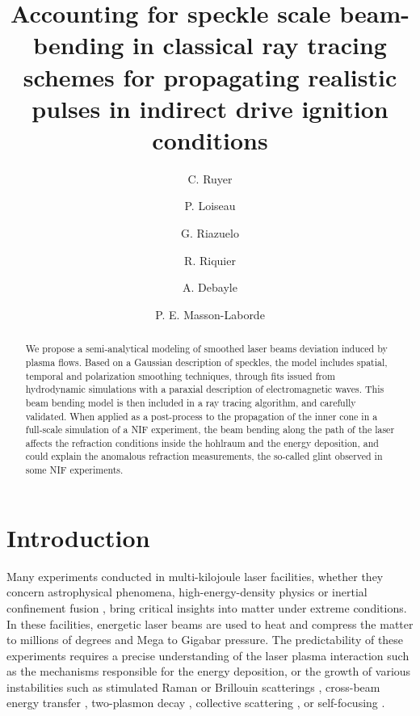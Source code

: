 \documentclass[%
 reprint,
 amsmath,amssymb,
 aps,
]{revtex4-1}
\begin{document}
\title{Accounting for speckle scale  beam-bending in classical ray tracing schemes for propagating realistic pulses in indirect drive ignition conditions}
\author{C. Ruyer}
\author{P. Loiseau}
\author{G. Riazuelo}
\author{R. Riquier}
\author{A. Debayle}
\author{P. E. Masson-Laborde}
\begin{abstract}
We propose a semi-analytical modeling of smoothed laser beams deviation induced by  plasma flows. Based on a Gaussian description of speckles, the model includes spatial, temporal and polarization smoothing techniques, through fits issued from  hydrodynamic simulations with a paraxial description of electromagnetic waves.
This beam bending model is then included in a ray tracing algorithm, and carefully validated.
When applied as a post-process to the propagation of the  inner cone in a full-scale simulation of a NIF experiment, the beam bending along the path of the laser affects the refraction conditions inside the hohlraum and the energy deposition, and could explain the anomalous refraction measurements, the so-called glint observed in some NIF experiments.
\end{abstract}

\maketitle

\section{Introduction}
Many experiments conducted in multi-kilojoule laser facilities, whether they concern astrophysical phenomena, high-energy-density physics \cite{Drake2006} or inertial confinement fusion \cite{Lindl_2004,Cavailler_2005,MRE_Zheng_2017},
bring critical insights into  matter under extreme  conditions. 
In these facilities, energetic laser beams are used to heat  and compress the matter to millions of degrees and  Mega to Gigabar pressure. 
The predictability of these experiments requires a precise understanding of the laser plasma interaction such as 
the mechanisms responsible for the energy deposition, or the growth of various instabilities such as stimulated Raman or Brillouin scatterings  \cite{Shen_1965,Forslund_1973,POP_Liu_2009,hao_2013}, cross-beam energy transfer \cite{hao_2016}, two-plasmon decay  \cite{Dubois_1995,Russell_2001}, collective scattering \cite[]{Dubois_1992,POP_Xiao_2019,MRE_Qiu_2021}, or self-focusing  \cite{Wagner_1968}.
\end{document}
